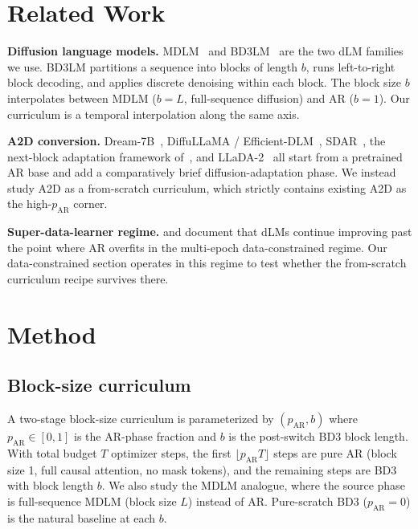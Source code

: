 \documentclass{article}
\newcommand{\pAR}{p_{\mathrm{AR}}}
\begin{document}
\section{Related Work}
\label{sec:related}

\textbf{Diffusion language models.} MDLM~\citep{sahoo2024simple, shi2024simplified} and BD3LM~\citep{arriola2025block} are the two dLM families we use. BD3LM partitions a sequence into blocks of length $b$, runs left-to-right block decoding, and applies discrete denoising within each block. The block size $b$ interpolates between MDLM ($b{=}L$, full-sequence diffusion) and AR ($b{=}1$). Our curriculum is a temporal interpolation along the same axis.

\textbf{A2D conversion.} Dream-7B~\citep{dream2025}, DiffuLLaMA / Efficient-DLM~\citep{efficientdlm2025}, SDAR~\citep{sdar2025}, the next-block adaptation framework of~\citet{nbdiff2025}, and LLaDA-2~\citep{llada2_2025} all start from a pretrained AR base and add a comparatively brief diffusion-adaptation phase. We instead study A2D as a from-scratch curriculum, which strictly contains existing A2D as the high-$\pAR$ corner.

\textbf{Super-data-learner regime.} \citet{ni2025diffusionlanguagemodelssuper} and \citet{gao2025whatmakes} document that dLMs continue improving past the point where AR overfits in the multi-epoch data-constrained regime. Our data-constrained section operates in this regime to test whether the from-scratch curriculum recipe survives there.

\section{Method}
\label{sec:method}

\subsection{Block-size curriculum}

A two-stage block-size curriculum is parameterized by $(\pAR, b)$ where $\pAR \in [0, 1]$ is the AR-phase fraction and $b$ is the post-switch BD3 block length. With total budget $T$ optimizer steps, the first $\lfloor \pAR T \rfloor$ steps are pure AR (block size 1, full causal attention, no mask tokens), and the remaining steps are BD3 with block length $b$. We also study the MDLM analogue, where the source phase is full-sequence MDLM (block size $L$) instead of AR. Pure-scratch BD3 ($\pAR{=}0$) is the natural baseline at each $b$.
\end{document}
